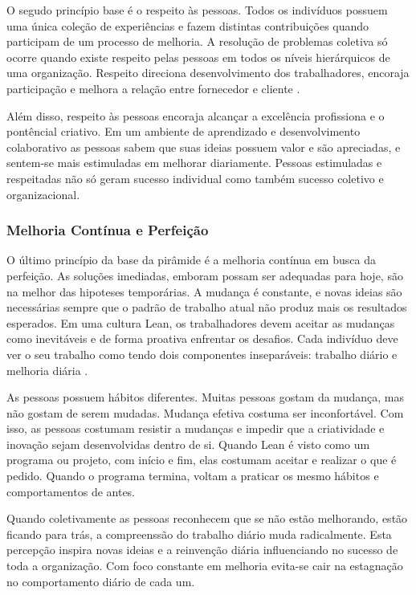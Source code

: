 O segudo princípio base é o respeito às pessoas. Todos os indivíduos possuem uma única coleção de experiências e fazem distintas contribuições quando participam de um processo de melhoria. A resolução de problemas coletiva só ocorre quando existe respeito pelas pessoas em todos os níveis hierárquicos de uma organização. Respeito direciona desenvolvimento dos trabalhadores, encoraja participação e melhora a relação entre fornecedor e cliente \cite{bell2011}.

Além disso, respeito às pessoas encoraja alcançar a excelência profissiona e o pontêncial criativo. Em um ambiente de aprendizado e desenvolvimento colaborativo as pessoas sabem que suas ideias possuem valor e são apreciadas, e sentem-se mais estimuladas em melhorar diariamente. Pessoas estimuladas e respeitadas não só geram sucesso individual como também sucesso coletivo e organizacional.


\subsubsection[Melhoria Contínua e Perfeição]{Melhoria Contínua e Perfeição}

O último princípio da base da pirâmide é a melhoria contínua em busca da perfeição.  As soluções imediadas, emboram possam ser adequadas para hoje, são na melhor das hipoteses temporárias.  A mudança é constante, e novas ideias são necessárias  sempre que o padrão de trabalho atual não produz mais os resultados esperados. Em uma cultura Lean, os trabalhadores devem aceitar as mudanças como inevitáveis e de forma proativa enfrentar os desafios. Cada indivíduo deve ver o seu trabalho como tendo dois componentes inseparáveis: trabalho diário e melhoria diária \cite{bell2011}.

As pessoas possuem hábitos diferentes. Muitas pessoas gostam da mudança, mas não gostam de serem mudadas. Mudança efetiva costuma ser inconfortável.  Com isso, as pessoas costumam resistir a mudanças e impedir que a criatividade e inovação sejam desenvolvidas dentro de si.  Quando Lean é visto como um programa ou projeto, com início e fim, elas costumam aceitar e realizar o que é pedido. Quando o programa termina, voltam a praticar os mesmo hábitos e comportamentos de antes.

Quando coletivamente as pessoas reconhecem que se não estão melhorando, estão ficando para trás, a compreenssão do trabalho diário muda radicalmente. Esta percepção inspira novas ideias e a reinvenção diária influenciando no sucesso de toda a organização. Com foco constante em melhoria evita-se cair na estagnação no comportamento diário de cada um.


